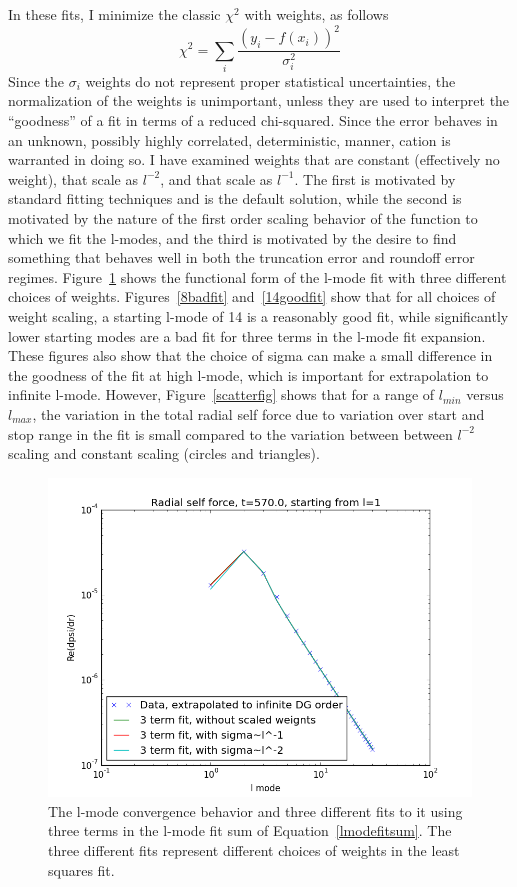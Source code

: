 In these fits, I minimize the classic $\chi^2$ with weights, as follows
\begin{equation}
\chi^2=\sum_i \frac{(y_i-f(x_i))^2}{\sigma_i^2}
\end{equation}
Since the $\sigma_i$ weights do not represent proper statistical uncertainties, the normalization of the weights is unimportant, unless they are used to interpret the ``goodness'' of a fit in terms of a reduced chi-squared. Since the error behaves in an unknown, possibly highly correlated, deterministic, manner, cation is warranted in doing so. I have examined weights that are constant (effectively no weight), that  scale as $l^{-2}$, and that scale as $l^{-1}$. The first is motivated by standard fitting techniques and is the default solution, while the second is motivated by the nature of the first order scaling behavior of the function to which we fit the l-modes, and the third is motivated by the desire to find something that behaves well in both the truncation error and roundoff error regimes. Figure~\ref{sigmafit} shows the functional form of the l-mode fit with three different choices of weights. Figures~\ref{8badfit} and~\ref{14goodfit} show that for all choices of weight scaling, a starting l-mode of 14 is a reasonably good fit, while significantly lower starting modes are a bad fit for three terms in the l-mode fit expansion. These figures also show that the choice of sigma can make a small difference in the goodness of the fit at high l-mode, which is important for extrapolation to infinite l-mode. However, Figure~\ref{scatterfig} shows that for a range of $l_{min}$ versus $l_{max}$, the variation in the total radial self force due to variation over start and stop range in the fit is small compared to the variation between between $l^{-2}$ scaling and constant scaling (circles and triangles). 

\begin{figure}
  \includegraphics{fiterrscalecorrect3term570l1}
  \caption{The l-mode convergence behavior and three different fits to it using three terms in the l-mode fit sum of Equation~\ref{lmodefitsum}. The three different fits represent different choices of weights in the least squares fit.}
\label{sigmafit}
\end{figure}

